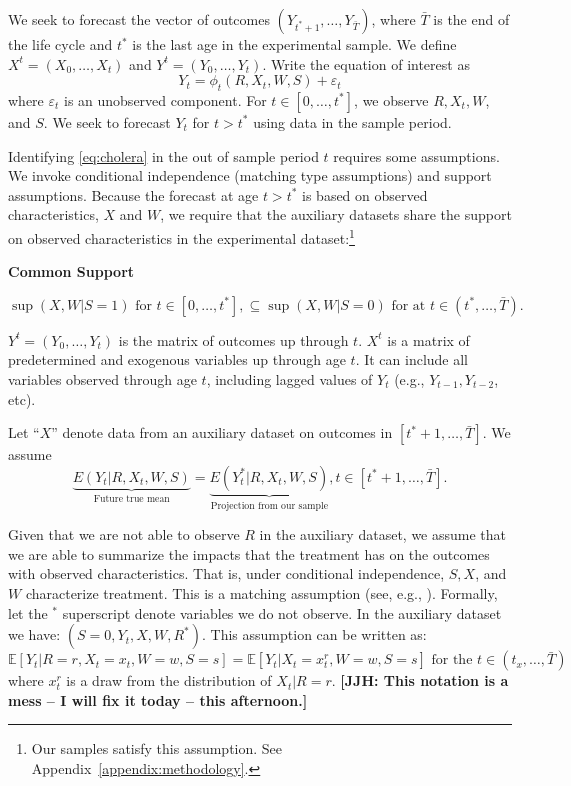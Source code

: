 We seek to forecast the vector of outcomes $(Y_{t^*+1},\dots,Y_{\bar{T}})$, where  $\bar{T}$ is the end of the life cycle and $t^*$ is the last age in the experimental sample. We define $X^t = (X_0,\ldots,X_t)$ and $Y^t = (Y_0,\ldots,Y_t)$. Write the equation of interest as
\begin{equation}\label{eq:cholera}
Y_t = \phi_t (R,X_t,W,S) + \varepsilon_t
\end{equation}
where $\varepsilon_t$ is an unobserved component. For $t \in [0,\ldots,t^*]$, we observe $R,X_t,W$, and $S$. We seek to forecast $Y_t$ for $t>t^*$ using data in the sample period.

Identifying \eqref{eq:cholera} in the out of sample period $t$ requires some assumptions. We invoke conditional independence (matching type assumptions) and support assumptions. Because the forecast at age $t>t^*$ is based on observed characteristics, $X$ and $W$, we require that the auxiliary datasets share the support on observed characteristics in the experimental dataset:\footnote{Our samples satisfy this assumption. See Appendix~\ref{appendix:methodology}.}

\begin{assumption}\label{assumption:tuberculosis}
\textbf{Common Support}
\end{assumption}
\begin{equation}
\sup \left( X,W | S = 1 \right) \text{ for } t \in [0,\ldots,t^*], \subseteq \sup \left( X,W | S = 0 \right) \text{ for at } t \in (t^*,\dots,\bar{T}).
\end{equation}

$Y^t = (Y_0,\dots,Y_t)$ is the matrix of outcomes up through $t$. $X^t$ is a matrix of predetermined and exogenous variables up through age $t$. It can include all variables observed through age $t$, including lagged values of $Y_t$ (e.g., $Y_{t-1}, Y_{t-2}$, etc).

Let ``$X$'' denote data from an auxiliary dataset on outcomes in $[t^*+1,\ldots,\bar{T}]$. We assume
\begin{equation}
\underbrace{E(Y_t | R, X_t, W, S)}_{\text{Future true mean}} = \underbrace{E(Y^*_t | R, X_t, W, S)}_{\text{Projection from our sample}}, t \in [t^*+1,\ldots,\bar{T}].
\end{equation}

Given that we are not able to observe $R$ in the auxiliary dataset, we assume that we are able to summarize the impacts that the treatment has on the outcomes with observed characteristics. That is, under conditional independence, $S, X$, and $W$ characterize treatment. This is a matching assumption (see, e.g., \citealp{Robins_Rotnitzky_1995_JASA}). Formally, let the $^{*}$ superscript denote variables we do not observe. In the auxiliary dataset we have: $\left( S = 0, Y_t, X, W, R^* \right)$. This assumption can be written as:
\begin{equation}
\mathbb{E} \left[Y_t | R = r, X_t = x_t, W = w, S = s\right] =  \mathbb{E} \left[ Y_t | X_t = x^r_t, W = w, S = s\right] \text{ for the } t \in (t_x,\dots,\bar{T})
\end{equation}
where $x^r_t$ is a draw from the distribution of $X_t | R = r$. \textbf{[JJH: This notation is a mess -- I will fix it today -- this afternoon.]}

